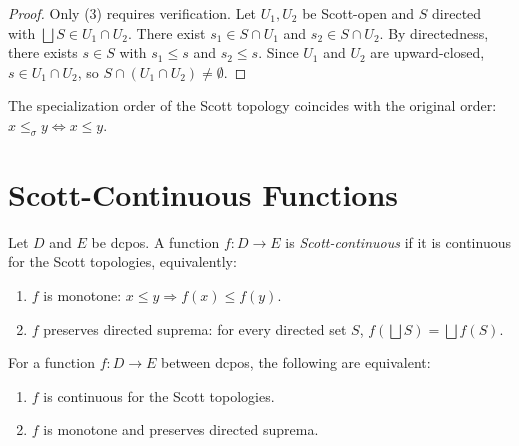 \begin{proof}
Only (3) requires verification. Let $U_1, U_2$ be Scott-open and $S$ directed with
$\bigsqcup S \in U_1 \cap U_2$. There exist $s_1 \in S \cap U_1$ and
$s_2 \in S \cap U_2$. By directedness, there exists $s \in S$ with $s_1 \leq s$ and
$s_2 \leq s$. Since $U_1$ and $U_2$ are upward-closed, $s \in U_1 \cap U_2$, so
$S \cap (U_1 \cap U_2) \neq \emptyset$.
\end{proof}

\begin{proposition}
The specialization order of the Scott topology coincides with the original order:
$x \leq_\sigma y \Leftrightarrow x \leq y$.
\end{proposition}

\section{Scott-Continuous Functions}

\begin{definition}
Let $D$ and $E$ be dcpos. A function $f\colon D \to E$ is \emph{Scott-continuous} if it is
continuous for the Scott topologies, equivalently:
\begin{enumerate}
  \item $f$ is monotone: $x \leq y \Rightarrow f(x) \leq f(y)$.
  \item $f$ preserves directed suprema: for every directed set $S$,
    $f(\bigsqcup S) = \bigsqcup f(S)$.
\end{enumerate}
\end{definition}

\begin{theorem}
For a function $f\colon D \to E$ between dcpos, the following are equivalent:
\begin{enumerate}
  \item $f$ is continuous for the Scott topologies.
  \item $f$ is monotone and preserves directed suprema.
\end{enumerate}
\end{theorem}


